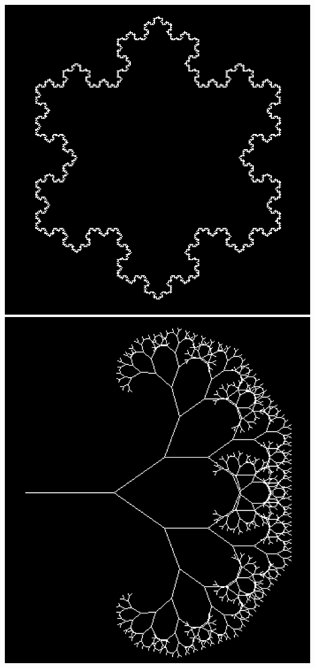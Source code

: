 \documentclass{article}
\begin{document}
\includegraphics[width=\textwidth]{pictures/snowflake.png}
\newpage
\includegraphics[width=\textwidth]{pictures/tree.png}
\end{document}
